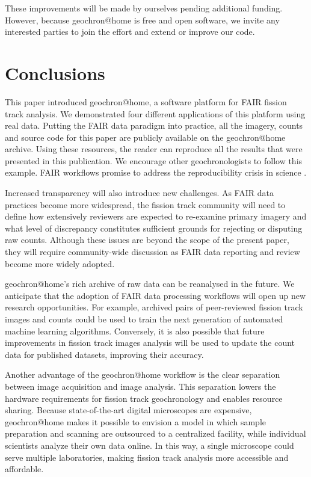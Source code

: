 \documentclass{article}
\begin{document}
These improvements will be made by ourselves pending additional
funding. However, because geochron@home is free and open software, we
invite any interested parties to join the effort and extend or improve
our code.

\section{Conclusions}\label{sec:conclusions}

This paper introduced geochron@home, a software platform for FAIR
fission track analysis. We demonstrated four different applications of
this platform using real data. Putting the FAIR data paradigm into
practice, all the imagery, counts and source code for this paper are
publicly available on the geochron@home archive. Using these
resources, the reader can reproduce all the results that were
presented in this publication.  We encourage other geochronologists to
follow this example.  FAIR workflows promise to address the
reproducibility crisis in science \citep{miyakawa2020}.\medskip

Increased transparency will also introduce new challenges. As FAIR
data practices become more widespread, the fission track community
will need to define how extensively reviewers are expected to
re-examine primary imagery and what level of discrepancy constitutes
sufficient grounds for rejecting or disputing raw counts. Although
these issues are beyond the scope of the present paper, they will
require community-wide discussion as FAIR data reporting and review
become more widely adopted.\medskip

geochron@home's rich archive of raw data can be reanalysed in
the future. We anticipate that the adoption of FAIR data processing
workflows will open up new research opportunities. For example,
archived pairs of peer-reviewed fission track images and counts could
be used to train the next generation of automated machine learning
algorithms. Conversely, it is also possible that future improvements
in fission track images analysis will be used to update the count data
for published datasets, improving their accuracy.\medskip

Another advantage of the geochron@home workflow is the clear
separation between image acquisition and image analysis. This
separation lowers the hardware requirements for fission track
geochronology and enables resource sharing. Because state-of-the-art
digital microscopes are expensive, geochron@home makes it possible to
envision a model in which sample preparation and scanning are
outsourced to a centralized facility, while individual scientists
analyze their own data online. In this way, a single microscope could
serve multiple laboratories, making fission track analysis more
accessible and affordable.
\medskip
\end{document}
